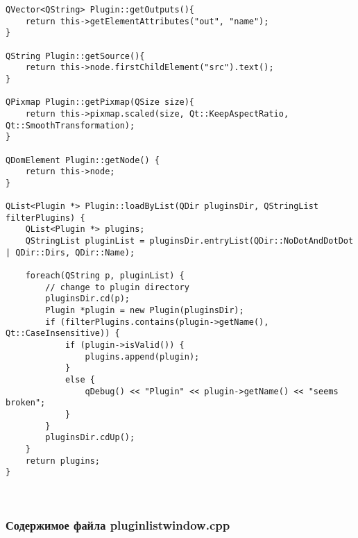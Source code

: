 \begin{lstlisting}
QVector<QString> Plugin::getOutputs(){
    return this->getElementAttributes("out", "name");
}

QString Plugin::getSource(){
    return this->node.firstChildElement("src").text();
}

QPixmap Plugin::getPixmap(QSize size){
    return this->pixmap.scaled(size, Qt::KeepAspectRatio, Qt::SmoothTransformation);
}

QDomElement Plugin::getNode() {
    return this->node;
}

QList<Plugin *> Plugin::loadByList(QDir pluginsDir, QStringList filterPlugins) {
    QList<Plugin *> plugins;
    QStringList pluginList = pluginsDir.entryList(QDir::NoDotAndDotDot | QDir::Dirs, QDir::Name);

    foreach(QString p, pluginList) {
        // change to plugin directory
        pluginsDir.cd(p);
        Plugin *plugin = new Plugin(pluginsDir);
        if (filterPlugins.contains(plugin->getName(), Qt::CaseInsensitive)) {
            if (plugin->isValid()) {
                plugins.append(plugin);
            }
            else {
                qDebug() << "Plugin" << plugin->getName() << "seems broken";
            }
        }
        pluginsDir.cdUp();
    }
    return plugins;
}
\end{lstlisting}~\\

\subsubsection*{Содержимое файла pluginlistwindow.cpp}

